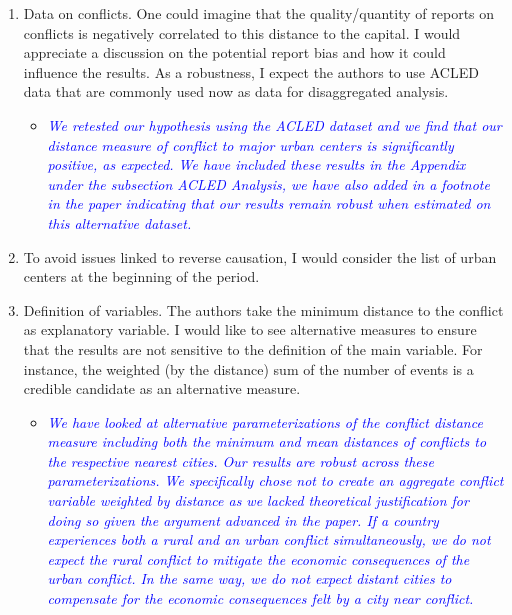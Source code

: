 \begin{enumerate}
\item Data on conflicts. One could imagine that the quality/quantity of reports on conflicts is negatively correlated to this distance to the capital. I would appreciate a discussion on the potential report bias and how it could influence the results. As a robustness, I expect the authors to use ACLED data that are commonly used now as data for disaggregated analysis.

\begin{itemize}
\item \textcolor{blue}{\emph{
	We retested our hypothesis using the ACLED dataset and we find that our distance measure of conflict to major urban centers is significantly positive, as expected. We have included these results in the Appendix under the subsection ACLED Analysis, we have also added in a footnote in the paper indicating that our results remain robust when estimated on this alternative dataset.
}}
\end{itemize}

\item To avoid issues linked to reverse causation, I would consider the list of urban centers at the beginning of the period.


\item Definition of variables. The authors take the minimum distance to the conflict as explanatory variable. I would like to see alternative measures to ensure that the results are not sensitive to the definition of the main variable. For instance, the weighted (by the distance) sum of the number of events is a credible candidate as an alternative measure.

\begin{itemize}
\item \textcolor{blue}{\emph{
	We have looked at alternative parameterizations of the conflict distance measure including both the minimum and mean distances of conflicts to the respective nearest cities. Our results are robust across these parameterizations. We specifically chose not to create an aggregate conflict variable weighted by distance as we lacked theoretical justification for doing so given the argument advanced in the paper. If a country experiences both a rural and an urban conflict simultaneously, we do not expect the rural conflict to mitigate the economic consequences of the urban conflict. In the same way, we do not expect distant cities to compensate for the economic consequences felt by a city near conflict.
}}
\end{itemize}

\end{enumerate}

